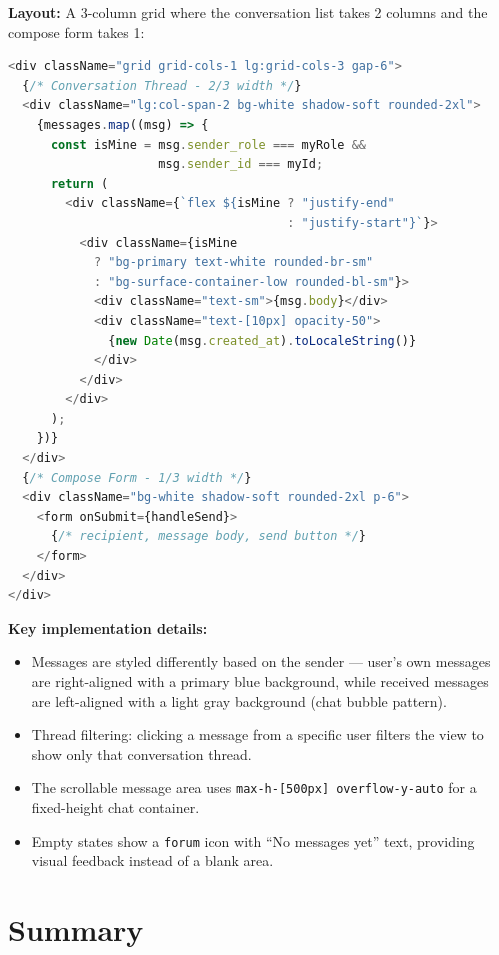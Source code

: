 \documentclass[12pt,a4paper]{article}
\begin{document}
\textbf{Layout:} A 3-column grid where the conversation list takes 2 columns and the compose form takes 1:

\begin{lstlisting}[language=TypeScript,title={Messages page — Split panel layout}]
<div className="grid grid-cols-1 lg:grid-cols-3 gap-6">
  {/* Conversation Thread - 2/3 width */}
  <div className="lg:col-span-2 bg-white shadow-soft rounded-2xl">
    {messages.map((msg) => {
      const isMine = msg.sender_role === myRole &&
                     msg.sender_id === myId;
      return (
        <div className={`flex ${isMine ? "justify-end"
                                       : "justify-start"}`}>
          <div className={isMine
            ? "bg-primary text-white rounded-br-sm"
            : "bg-surface-container-low rounded-bl-sm"}>
            <div className="text-sm">{msg.body}</div>
            <div className="text-[10px] opacity-50">
              {new Date(msg.created_at).toLocaleString()}
            </div>
          </div>
        </div>
      );
    })}
  </div>
  {/* Compose Form - 1/3 width */}
  <div className="bg-white shadow-soft rounded-2xl p-6">
    <form onSubmit={handleSend}>
      {/* recipient, message body, send button */}
    </form>
  </div>
</div>
\end{lstlisting}

\textbf{Key implementation details:}
\begin{itemize}[leftmargin=2em]
    \item Messages are styled differently based on the sender — user's own messages are right-aligned with a primary blue background, while received messages are left-aligned with a light gray background (chat bubble pattern).
    \item Thread filtering: clicking a message from a specific user filters the view to show only that conversation thread.
    \item The scrollable message area uses \texttt{max-h-[500px] overflow-y-auto} for a fixed-height chat container.
    \item Empty states show a \texttt{forum} icon with ``No messages yet'' text, providing visual feedback instead of a blank area.
\end{itemize}

\section{Summary}
\end{document}
